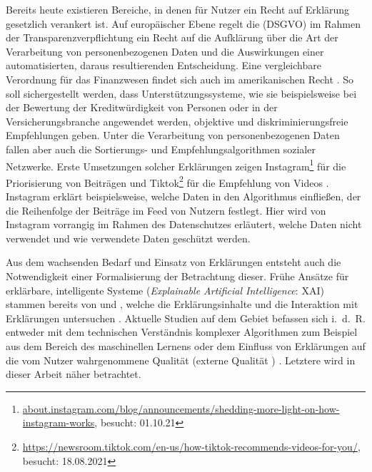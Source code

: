 Bereits heute existieren Bereiche, in denen für Nutzer ein \glqq Recht auf Erklärung\grqq{} gesetzlich verankert ist. Auf europäischer Ebene regelt die  (DSGVO) \cite{eu_verordnung_2016} im Rahmen der Transparenzverpflichtung ein Recht auf die Aufklärung über die Art der Verarbeitung von personenbezogenen Daten und die Auswirkungen einer automatisierten, daraus resultierenden Entscheidung. Eine vergleichbare Verordnung für das Finanzwesen findet sich auch im amerikanischen Recht \cite{cfpb_regulation_2018}. So soll sichergestellt werden, dass Unterstützungssysteme, wie sie beispielsweise bei der Bewertung der Kreditwürdigkeit von Personen oder in der Versicherungsbranche angewendet werden, objektive und diskriminierungsfreie Empfehlungen geben. Unter die Verarbeitung von personenbezogenen Daten fallen aber auch die Sortierungs- und Empfehlungsalgorithmen sozialer Netzwerke. Erste Umsetzungen solcher Erklärungen zeigen Instagram\footnote{\url{about.instagram.com/blog/announcements/shedding-more-light-on-how-instagram-works}, besucht: 01.10.21} für die Priorisierung von Beiträgen und Tiktok\footnote{\url{https://newsroom.tiktok.com/en-us/how-tiktok-recommends-videos-for-you/}, besucht: 18.08.2021} für die Empfehlung von Videos \cite{mosseri_shedding_2021,tiktok_technology_limited_how_2021}. Instagram erklärt beispielsweise, welche Daten in den Algorithmus einfließen, der die Reihenfolge der Beiträge im Feed von Nutzern festlegt. Hier wird von Instagram vorrangig im Rahmen des Datenschutzes erläutert, welche Daten nicht verwendet und wie verwendete Daten geschützt werden.

Aus dem wachsenden Bedarf und Einsatz von Erklärungen entsteht auch die Notwendigkeit einer Formalisierung der Betrachtung dieser. Frühe Ansätze für erklärbare, intelligente Systeme (\textit{Explainable Artificial Intelligence}: XAI) stammen bereits von \citeauthor{byrne1991construction} und \citeauthor{cawsey1991generating}, welche die Erklärungsinhalte \cite{byrne1991construction} und die Interaktion mit Erklärungen untersuchen \cite{cawsey1991generating}. Aktuelle Studien auf dem Gebiet befassen sich i.~d.~R. entweder mit dem technischen Verständnis komplexer Algorithmen zum Beispiel aus dem Bereich des maschinellen Lernens \cite{gilpin_explaining_2018, fong_interpretable_2017, samek_towards_2019} oder dem Einfluss von Erklärungen auf die vom Nutzer wahrgenommene Qualität (externe Qualität \cite{international2011iso}) \cite{nunes_systematic_2017,kouki_user_2017,chazette_end-users_nodate}. Letztere wird in dieser Arbeit näher betrachtet.


